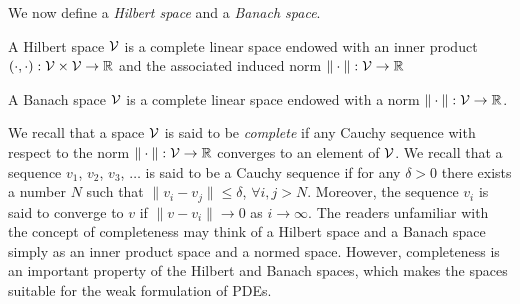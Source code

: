 We now define a \emph{Hilbert space} and a \emph{Banach space}.
\begin{definition}
  A Hilbert space $\mathcal{V}$ is a complete linear space endowed with an inner product $(\cdot,\cdot): \mathcal{V} \times \mathcal{V} \to \mathbb{R}$ and the associated induced norm $\| \cdot \|: \mathcal{V} \to \mathbb{R}$ 
\end{definition}
\begin{definition}
  A Banach space $\mathcal{V}$ is a complete linear space endowed with a norm $\| \cdot \|: \mathcal{V} \to \mathbb{R}$.
\end{definition}
We recall that a space $\mathcal{V}$ is said to be \emph{complete} if any Cauchy sequence with respect to the norm $\| \cdot \|: \mathcal{V} \to \mathbb{R}$ converges to an element of $\mathcal{V}$.  We recall that a sequence $v_1$, $v_2$, $v_3$, $\dots$ is said to be a Cauchy sequence if for any $\delta > 0$ there exists a number $N$ such that $\| v_i - v_j \| \leq \delta$, $\forall i,j  > N$.  Moreover, the sequence $v_i$ is said to converge to $v$ if $\| v - v_i \| \to 0$ as $i \to \infty$. The readers unfamiliar with the concept of completeness may think of a Hilbert space and a Banach space simply as an inner product space and a normed space. However, completeness is an important property of the Hilbert and Banach spaces, which makes the spaces suitable for the weak formulation of PDEs.

